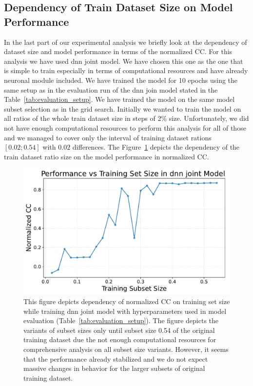 \subsection{Dependency of Train Dataset Size on Model Performance}
\label{subsec:train_size_dataset_depencdency}
In the last part of our experimental analysis we briefly look at the dependency of dataset size and model performance in terms of the normalized CC. For this analysis we have used dnn joint model. We have chosen this one as the one that is simple to train especially in terms of computational resources and have already neuronal module included. We have trained the model for 10 epochs using the same setup as in the evaluation run of the dnn join model stated in the Table~\ref{tab:evaluation_setup}. We have trained the model on the same model subset selection as in the grid search. Initially we wanted to train the model on all ratios of the whole train dataset size in steps of 2\% size. Unfortunately, we did not have enough computational resources to perform this analysis for all of those and we managed to cover only the interval of training dataset rations $[0.02; 0.54]$ with $0.02$ differences. The Figure~\ref{fig:train_size_cc_norm_dependency} depicts the dependency of the train dataset ratio size on the model performance in normalized CC.  

\begin{figure}
    \centering
    \includegraphics[width=0.8\linewidth]{img/plots/train_size_performance_dependency.pdf}
    \caption{This figure depicts dependency of normalized CC on training set size while training dnn joint model with hyperparameters used in model evaluation (Table~\ref{tab:evaluation_setup}). The figure depicts the variants of subset sizes only until subset size 0.54 of the original training dataset due the not enough computational resources for comprehensive analysis on all subset size variants. However, it seems that the performance already stabilized and we do not expect massive changes in behavior for the larger subsets of original training dataset.}
    \label{fig:train_size_cc_norm_dependency}
\end{figure}

